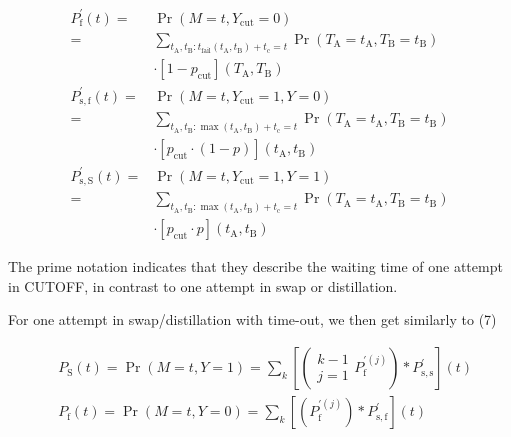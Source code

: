 \documentclass{masterthesis}
\begin{document}
$$
\begin{aligned}
P_{\mathrm{f}}^{\prime}(t)= & \operatorname{Pr}\left(M=t, Y_{\mathrm{cut}}=0\right) \\
= & \sum_{t_{\mathrm{A}}, t_{\mathrm{B}}: t_{\mathrm{fail}}\left(t_{\mathrm{A}}, t_{\mathrm{B}}\right)+t_{\mathrm{c}}=t} \operatorname{Pr}\left(T_{\mathrm{A}}=t_{\mathrm{A}}, T_{\mathrm{B}}=t_{\mathrm{B}}\right) \\
& \cdot\left[1-p_{\mathrm{cut}}\right]\left(T_{\mathrm{A}}, T_{\mathrm{B}}\right) \\
P_{\mathrm{s}, \mathrm{f}}^{\prime}(t)= & \operatorname{Pr}\left(M=t, Y_{\mathrm{cut}}=1, Y=0\right) \\
= & \sum_{t_{\mathrm{A}}, t_{\mathrm{B}}: \max \left(t_{\mathrm{A}}, t_{\mathrm{B}}\right)+t_{\mathrm{c}}=t} \operatorname{Pr}\left(T_{\mathrm{A}}=t_{\mathrm{A}}, T_{\mathrm{B}}=t_{\mathrm{B}}\right) \\
& \cdot\left[p_{\mathrm{cut}} \cdot(1-p)\right]\left(t_{\mathrm{A}}, t_{\mathrm{B}}\right) \\
P_{\mathrm{s}, \mathrm{S}}^{\prime}(t)= & \operatorname{Pr}\left(M=t, Y_{\mathrm{cut}}=1, Y=1\right) \\
= & \sum_{t_{\mathrm{A}}, t_{\mathrm{B}}: \max \left(t_{\mathrm{A}}, t_{\mathrm{B}}\right)+t_{\mathrm{c}}=t} \operatorname{Pr}\left(T_{\mathrm{A}}=t_{\mathrm{A}}, T_{\mathrm{B}}=t_{\mathrm{B}}\right) \\
& \cdot\left[p_{\mathrm{cut}} \cdot p\right]\left(t_{\mathrm{A}}, t_{\mathrm{B}}\right)
\end{aligned}
$$

The prime notation indicates that they describe the waiting time of one attempt in CUTOFF, in contrast to one attempt in swap or distillation.

For one attempt in swap/distillation with time-out, we then get similarly to (7)

$$
\begin{aligned}
& P_{\mathrm{S}}(t)=\operatorname{Pr}(M=t, Y=1)=\sum_{k}\left[\left(\begin{array}{c}
k-1 \\
j=1
\end{array} P_{\mathrm{f}}^{\prime(j)}\right) * P_{\mathrm{s}, \mathrm{s}}^{\prime}\right](t) \\
& P_{\mathrm{f}}(t)=\operatorname{Pr}(M=t, Y=0)=\sum_{k}\left[\left( P_{\mathrm{f}}^{\prime(j)}\right) * P_{\mathrm{s}, \mathrm{f}}^{\prime}\right](t)
\end{aligned}
$$
\end{document}
